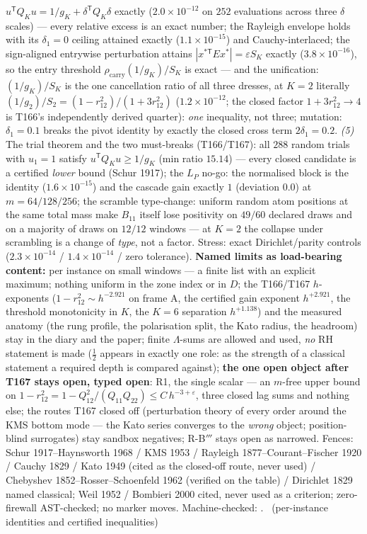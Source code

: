 $u^{\mathsf T}Q_Ku=1/g_K+\delta^{\mathsf T}Q_K\delta$ exactly
($2.0\times10^{-12}$ on $252$ evaluations across three $\delta$ scales)
--- every relative excess is an exact number; the Rayleigh envelope
holds with its $\delta_1=0$ ceiling attained exactly
($1.1\times10^{-15}$) and Cauchy-interlaced; the sign-aligned entrywise
perturbation attains $|x^{*\mathsf T}Ex^*|=\varepsilon S_K$ exactly
($3.8\times10^{-16}$), so the entry threshold
$\rho_{\mathrm{carry}}(1/g_K)/S_K$ is exact --- and the unification:
$(1/g_K)/S_K$ is the one cancellation ratio of all three dresses, at
$K=2$ literally $(1/g_2)/S_2=(1-r_{12}^2)/(1+3r_{12}^2)$
($1.2\times10^{-12}$; the closed factor $1+3r_{12}^2\to4$ is T166's
independently derived quarter): \emph{one} inequality, not three;
mutation: $\delta_1=0.1$ breaks the pivot identity by exactly the
closed cross term $2\delta_1=0.2$. \emph{(5)} The trial theorem and the
two must-breaks (T166/T167): all $288$ random trials with $u_1=1$
satisfy $u^{\mathsf T}Q_Ku\ge1/g_K$ (min ratio $15.14$) --- every
closed candidate is a certified \emph{lower} bound (Schur 1917); the
$L_P$ no-go: the normalised block is the identity
($1.6\times10^{-15}$) and the cascade gain exactly $1$ (deviation
$0.0$) at $m=64/128/256$; the scramble type-change: uniform random
atom positions at the same total mass make $B_{11}$ itself lose
positivity on $49/60$ declared draws and on a majority of draws on
$12/12$ windows --- at $K=2$ the collapse under scrambling is a change
of \emph{type}, not a factor. Stress: exact Dirichlet/parity controls
($2.3\times10^{-14}$ / $1.4\times10^{-14}$ / zero tolerance).
\textbf{Named limits as load-bearing content:} per instance on small
windows --- a finite list with an explicit maximum; nothing uniform in
the zone index or in $D$; the T166/T167 $h$-exponents
($1-r_{12}^2\sim h^{-2.921}$ on frame A, the certified gain exponent
$h^{+2.921}$, the threshold monotonicity in $K$, the $K=6$ separation
$h^{+1.138}$) and the measured anatomy (the rung profile, the
polarisation split, the Kato radius, the headroom) stay in the diary
and the paper; finite $\Lambda$-sums are allowed and used, \emph{no} RH
statement is made ($\tfrac12$ appears in exactly one role: as the
strength of a classical statement a required depth is compared
against); \textbf{the one open object after T167 stays open, typed
open}: R1, the single scalar --- an $m$-free upper bound on
$1-r_{12}^2=1-Q_{12}^2/(Q_{11}Q_{22})\le C\,h^{-3+\varepsilon}$, three
closed lag sums and nothing else; the routes T167 closed off
(perturbation theory of every order around the KMS bottom mode --- the
Kato series converges to the \emph{wrong} object; position-blind
surrogates) stay sandbox negatives; R-B$'''$ stays open as narrowed.
Fences: Schur 1917--Haynsworth 1968 / KMS 1953 / Rayleigh
1877--Courant--Fischer 1920 / Cauchy 1829 / Kato 1949 (cited as the
closed-off route, never used) / Chebyshev 1852--Rosser--Schoenfeld 1962
(verified on the table) / Dirichlet 1829 named classical; Weil 1952 /
Bombieri 2000 cited, never used as a criterion; zero-firewall
AST-checked; no marker moves.
Machine-checked: .
\mE\ (per-instance identities and certified inequalities)


